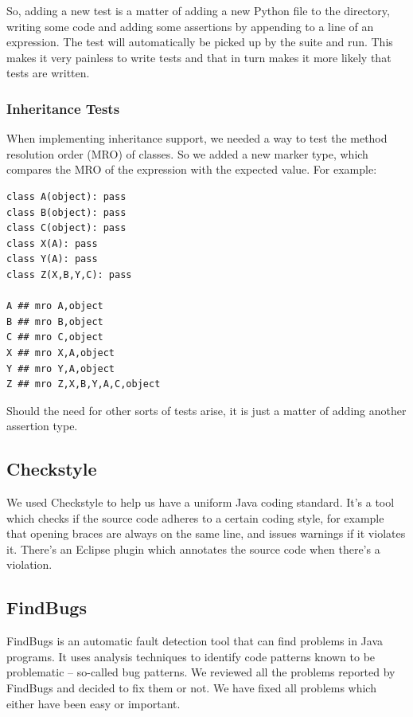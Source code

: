\documentclass[12pt,halfparskip,DIV11,BCOR10mm]{scrreprt}
\begin{document}
So, adding a new test is a matter of adding a new Python file to the directory, writing some code and adding some assertions by appending  to a line of an expression. The test will automatically be picked up by the suite and run. This makes it very painless to write tests and that in turn makes it more likely that tests are written.

\subsubsection{Inheritance Tests}

When implementing inheritance support, we needed a way to test the method resolution order (MRO) of classes. So we added a new marker type,  which compares the MRO of the expression with the expected value. For example:

\begin{lstlisting}
class A(object): pass
class B(object): pass
class C(object): pass
class X(A): pass
class Y(A): pass
class Z(X,B,Y,C): pass

A ## mro A,object
B ## mro B,object
C ## mro C,object
X ## mro X,A,object
Y ## mro Y,A,object
Z ## mro Z,X,B,Y,A,C,object
\end{lstlisting}

Should the need for other sorts of tests arise, it is just a matter of adding another assertion type.

\subsection{Checkstyle}

We used Checkstyle to help us have a uniform Java coding standard. It's a tool which checks if the source code adheres to a certain coding style, for example that opening braces are always on the same line, and issues warnings if it violates it. There's an Eclipse plugin which annotates the source code when there's a violation.


\subsection{FindBugs}

FindBugs is an automatic fault detection tool that can find problems in Java programs. It uses analysis techniques to identify code patterns known to be problematic – so-called bug patterns. We reviewed all the problems reported by FindBugs and decided to fix them or not. We have fixed all problems which either have been easy or important.
\end{document}
